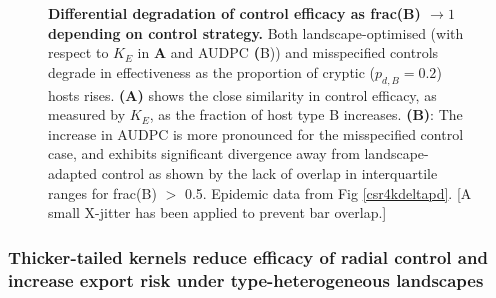\documentclass[11pt,letterpaper]{article}
\begin{document}
\begin{figure}
	\centering
%

\caption{\label{deltacompare4kcsr} \textbf{Differential degradation of control efficacy as frac(B) $\rightarrow 1$ depending on control strategy.} Both landscape-optimised (with respect to $K_{E}$ in \textbf{A} and AUDPC \textbf(B)) and misspecified controls degrade in effectiveness as the proportion of cryptic ($p_{d,B} = 0.2$) hosts rises. \textbf{(A)} shows the close similarity in control efficacy, as measured by $K_E$, as the fraction of host type B increases. \textbf{(B)}: The increase in AUDPC is more pronounced for the misspecified control case, and exhibits significant divergence away from landscape-adapted control as shown by the lack of overlap in interquartile ranges for frac(B) $>$ 0.5. Epidemic data from Fig \ref{csr4kdeltapd}. [A small X-jitter has been applied to prevent bar overlap.]}
\end{figure}
\FloatBarrier
  \subsubsection*{Thicker-tailed kernels reduce efficacy of radial control and increase export risk under type-heterogeneous landscapes}
 
\end{document}
